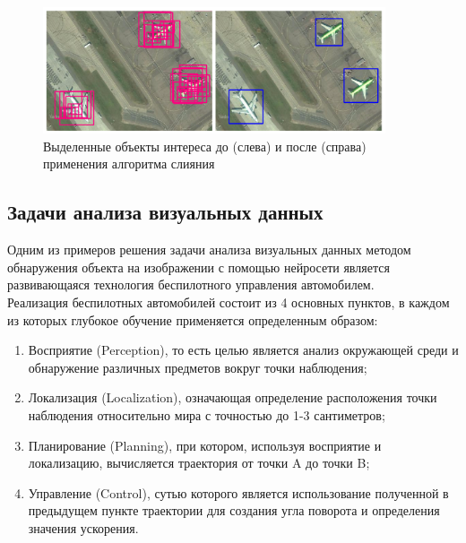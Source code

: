 \documentclass[bachelor, och, coursework]{SCWorks}
\begin{document}
        \begin{figure}[H]
            \centering
            \includegraphics[width=0.9\textwidth]{pic/aero.png}
            \caption{Выделенные объекты интереса до (слева) и после (справа) применения алгоритма слияния}
            \label{fig:img9}
        \end{figure}
        
    \subsection{Задачи анализа визуальных данных}
        Одним из примеров решения задачи анализа визуальных данных методом обнаружения объекта на изображении с помощью нейросети является развивающаяся технология беспилотного управления автомобилем. \cite{automl}\\
        Реализация беспилотных автомобилей состоит из 4 основных пунктов, в каждом из которых глубокое обучение применяется определенным образом:
        \begin{enumerate}
            \item Восприятие (Perception), то есть целью является анализ окружающей среди и обнаружение различных предметов вокруг точки наблюдения;
            \item Локализация (Localization), означающая определение расположения точки наблюдения относительно мира с точностью до 1-3 сантиметров;
            \item Планирование (Planning), при котором, используя восприятие и локализацию, вычисляется траектория от точки A до точки B;
            \item Управление (Control), сутью которого является использование полученной в предыдущем пункте траектории для создания угла поворота и определения значения ускорения.
        \end{enumerate}
\end{document}
